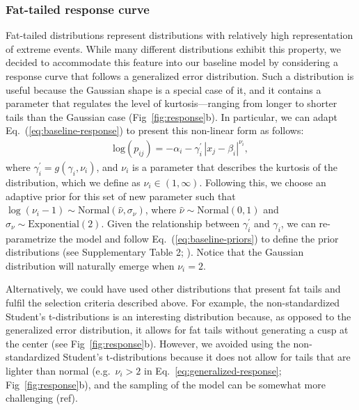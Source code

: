 \documentclass[11pt, a4paper]{article}
\begin{document}
\subsubsection*{Fat-tailed response curve}
Fat-tailed distributions represent distributions with relatively high representation of extreme events. While many different distributions exhibit this property, we decided to accommodate this feature into our baseline model by considering a response curve that follows a generalized error distribution. Such a distribution is useful because the Gaussian shape is a special case of it, and it contains a parameter that regulates the level of kurtosis---ranging from longer to shorter tails than the Gaussian case (Fig~\ref{fig:response}b). In particular, we can adapt Eq.~(\ref{eq:baseline-response}) to present this non-linear form as follows:
\begin{equation}
\begin{split}
\text{log}\left(p_{ij}\right) = -\alpha_{i} - \gamma^{\prime}_{i}\, |x_{j}-\beta_{i}|^{\nu_{i}} ,
\end{split}
\label{eq:generalized-response}
\end{equation}
where $\gamma^{\prime}_{i} = g(\gamma_{i}, \nu_{i})$, and $\nu_{i}$ is a parameter that describes the kurtosis of the distribution, which we define as $\nu_{i}\in\left(1, \infty\right)$. Following this, we choose an adaptive prior for this set of new parameter such that $\log\left(\nu_{i}-1\right)\sim \text{Normal}\left(\hat{\nu}, \sigma_{\nu}\right)$, where $\hat{\nu}\sim\text{Normal}\left(0, 1\right)$ and $\sigma_{\nu}\sim\text{Exponential}\left(2\right)$. Given the relationship between $\gamma^{\prime}_{i}$ and $\gamma_{i}$,  we can re-parametrize the model and follow Eq.~(\ref{eq:baseline-priors}) to define the prior distributions (see Supplementary Table 2; \citealt{nadarajahGeneralizedNormalDistribution2005}). Notice that the Gaussian distribution will naturally emerge when $\nu_i=2$.

Alternatively, we could have used other distributions that present fat tails and fulfil the selection criteria described above. For example, the non-standardized Student's t-distributions is an interesting distribution because, as opposed to the generalized error distribution, it allows for fat tails without generating a cusp at the center (see Fig~\ref{fig:response}b). However, we avoided using the non-standardized Student's t-distributions because it does not allow for tails that are lighter than normal (e.g.~$\nu_i>2$ in Eq.~\ref{eq:generalized-response}; Fig~\ref{fig:response}b), and the sampling of the model can be somewhat more challenging (ref). 
\end{document}
